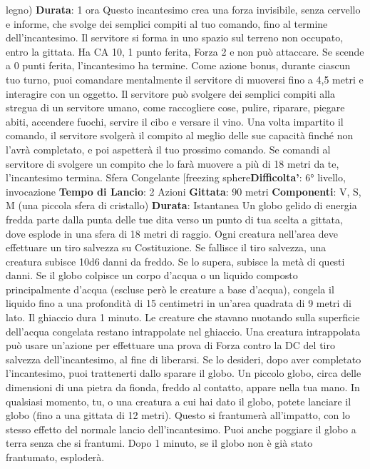 \begin{multicols}{2}
legno)
\textbf{Durata}: 1 ora
Questo incantesimo crea una forza invisibile, senza
cervello e informe, che svolge dei semplici compiti al
tuo comando, fino al termine dell’incantesimo. Il
servitore si forma in uno spazio sul terreno non
occupato, entro la gittata. Ha CA 10, 1 punto ferita,
Forza 2 e non può attaccare. Se scende a 0 punti ferita,
l’incantesimo ha termine.
Come azione bonus, durante ciascun tuo turno, puoi
comandare mentalmente il servitore di muoversi fino a
4,5 metri e interagire con un oggetto. Il servitore può
svolgere dei semplici compiti alla stregua di un servitore
umano, come raccogliere cose, pulire, riparare, piegare
abiti, accendere fuochi, servire il cibo e versare il vino.
Una volta impartito il comando, il servitore svolgerà il
compito al meglio delle sue capacità finché non l’avrà
completato, e poi aspetterà il tuo prossimo comando.
Se comandi al servitore di svolgere un compito che lo
farà muovere a più di 18 metri da te, l’incantesimo
termina.
Sfera Congelante
[freezing sphere\textbf{Difficolta'}:
6° livello, invocazione
\textbf{Tempo di Lancio}: 2 Azioni
\textbf{Gittata}: 90 metri
\textbf{Componenti}: V, S, M (una piccola sfera di cristallo)
\textbf{Durata}: Istantanea
Un globo gelido di energia fredda parte dalla punta
delle tue dita verso un punto di tua scelta a gittata, dove
esplode in una sfera di 18 metri di raggio. Ogni creatura
nell’area deve effettuare un tiro salvezza su
Costituzione. Se fallisce il tiro salvezza, una creatura
subisce 10d6 danni da freddo. Se lo supera, subisce la
metà di questi danni.
Se il globo colpisce un corpo d’acqua o un liquido
composto principalmente d’acqua (escluse però le
creature a base d’acqua), congela il liquido fino a una
profondità di 15 centimetri in un’area quadrata di 9 metri
di lato. Il ghiaccio dura 1 minuto. Le creature che
stavano nuotando sulla superficie dell’acqua congelata
restano intrappolate nel ghiaccio. Una creatura
intrappolata può usare un’azione per effettuare una
prova di Forza contro la DC del tiro salvezza
dell’incantesimo, al fine di liberarsi.
Se lo desideri, dopo aver completato l’incantesimo, puoi
trattenerti dallo sparare il globo. Un piccolo globo, circa
delle dimensioni di una pietra da fionda, freddo al
contatto, appare nella tua mano. In qualsiasi momento,
tu, o una creatura a cui hai dato il globo, potete lanciare
il globo (fino a una gittata di 12 metri). Questo si
frantumerà all’impatto, con lo stesso effetto del normale
lancio dell’incantesimo. Puoi anche poggiare il globo a
terra senza che si frantumi. Dopo 1 minuto, se il globo
non è già stato frantumato, esploderà.

\end{multicols}
